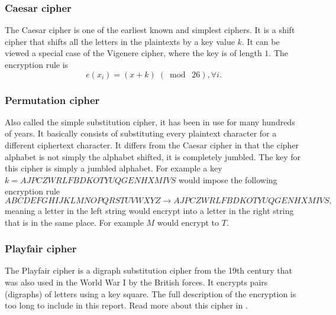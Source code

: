 \documentclass[a4paper]{article}
\begin{document}
\subsubsection{Caesar cipher}
The Caesar cipher is one of the earliest known and simplest ciphers. It is a shift cipher that shifts all the letters in the plaintexts by a key value $k$. It can be viewed a special case of the Vigenere cipher, where the key is of length $1$. The encryption rule is
$$e(x_{i}) = (x + k) \;(\bmod\; 26), \forall i.$$

\subsubsection{Permutation cipher}
Also called the simple substitution cipher, it has been in use for many hundreds of years. It basically consists of substituting every plaintext character for a different ciphertext character. It differs from the Caesar cipher in that the cipher alphabet is not simply the alphabet shifted, it is completely jumbled. The key for this cipher is simply a jumbled alphabet. For example a key $k = AJPCZWRLFBDKOTYUQGENHXMIVS$ would impose the following encryption rule
$$ABCDEFGHIJKLMNOPQRSTUVWXYZ \rightarrow AJPCZWRLFBDKOTYUQGENHXMIVS,$$
meaning a letter in the left string would encrypt into a letter in the right string that is in the same place. For example $M$ would encrypt to $T$.

\subsubsection{Playfair cipher}
The Playfair cipher is a digraph substitution cipher from the 19th century that was also used in the World War I by the British forces. It encrypts pairs (digraphs) of letters using a key square. The full description of the encryption is too long to include in this report. Read more about this cipher in \cite{practicalCrypto}.

\end{document}
